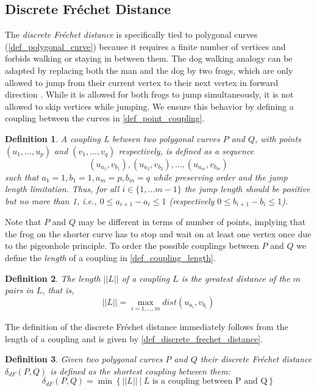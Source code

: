 \documentclass[
oneside,
fontsize=11pt
]{scrartcl}
\newtheorem{mydef}{Definition}
\begin{document}
\subsection{Discrete Fréchet Distance}
The \textit{discrete Fréchet distance} is specifically tied to 
polygonal curves (\autoref{def_polygonal_curve}) 
because it requires a finite number of vertices 
and forbids walking or staying in between them.
The dog walking analogy can be adapted by replacing both the man and the dog by two frogs,
which are only allowed to jump from their current vertex to their next 
vertex in forward direction \cite{bringmann_why_2014}.
While it is allowed for both frogs to jump simultaneously,
it is not allowed to skip vertices while jumping. 
We ensure this behavior by defining a coupling between the curves in \autoref{def_point_coupling}.

\begin{mydef}
  \label{def_point_coupling}
  A \textit{coupling} L between two polygonal curves $P$ and $Q$, 
  with points $(u_1, \dots, u_p)$ and $(v_1, \dots, v_q)$ respectively, 
  is defined as a sequence
  $$(u_{a_1}, v_{b_1}),(u_{a_2}, v_{b_2}), \dots, (u_{a_m}, v_{b_m})$$
  such that $a_1 = 1, b_1 = 1, a_m = p, b_m = q$ 
  while preserving order and the jump length limitation.
  Thus, for all $i \in \{1, \dots m-1\}$
  the jump length should be positive but no more than 1,
  i.e., $0 \leq a_{i+1} - a_i \leq 1$ (respectively $0 \leq b_{i+1} - b_i \leq 1$).
\end{mydef}

Note that $P$ and $Q$ may be different in terms of number of points,
implying that the frog on the shorter curve 
has to stop and wait on at least one vertex once
due to the pigeonhole principle.
To order the possible couplings between $P$ and $Q$ we define the 
\textit{length} of a coupling in \autoref{def_coupling_length}. 

\begin{mydef}
  \label{def_coupling_length}
  The \textit{length} $||L||$ of a coupling $L$ is the greatest distance of the $m$ pairs in $L$, that is, 
  $$||L|| = \max_{i=1, \dots, m} dist(u_{a_i}, v_{b_i})$$
\end{mydef}

The definition of the discrete Fréchet distance immediately follows from 
the length of a coupling and is given by \autoref{def_discrete_frechet_distance}.

\begin{mydef}
  \label{def_discrete_frechet_distance}
  Given two polygonal curves $P$ and $Q$
  their discrete Fréchet distance $\delta_{dF}(P,Q)$ is defined as the shortest coupling between them: 
  $$\delta_{dF}(P,Q) = \min \left\{ ||L|| \ | \  L \text{ is a coupling between P and Q} \right\}$$
\end{mydef}
\end{document}
